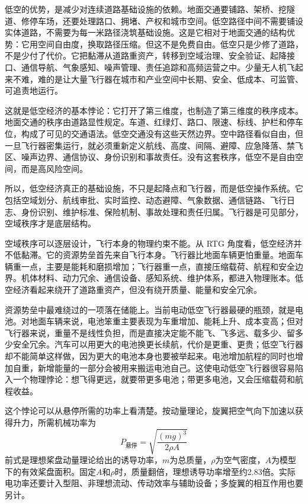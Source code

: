 
低空的优势，是减少对连续道路基础设施的依赖。地面交通要铺路、架桥、挖隧道、修停车场，还要处理路口、拥堵、产权和城市空间。低空路径中间不需要铺设实体道路，不需要为每一米路径浇筑基础设施。这是它相对于地面交通的结构优势：它用空间自由度，换取路径压缩。但这不是免费自由。低空只是少修了道路，不是少付了代价。它把黏滞从道路重资产，转移到空域治理、安全验证、起降接口、通信导航、气象感知、噪声管理、责任追踪和高频运营之中。少量无人机飞起来不难，难的是让大量飞行器在城市和产业空间中长期、安全、低成本、可监管、可追责地运行。

这就是低空经济的基本悖论：它打开了第三维度，也制造了第三维度的秩序成本。地面交通的秩序由道路显性规定。车道、红绿灯、路口、限速、标线、护栏和停车位，构成了可见的交通语法。低空交通没有这些天然边界。空中路径看似自由，但一旦飞行器密集运行，就必须重新定义航线、高度、间隔、避障、应急降落、禁飞区、噪声边界、通信协议、身份识别和事故责任。没有这套秩序，低空不是自由空间，而是高风险空间。

所以，低空经济真正的基础设施，不只是起降点和飞行器，而是低空操作系统。它包括空域划分、航线审批、实时监控、动态避障、气象数据、通信链路、飞行日志、身份识别、维护标准、保险机制、事故处理和责任归属。飞行器是可见部分，空域秩序才是底层结构。

空域秩序可以逐层设计，飞行本身的物理约束不能。从 RTG 角度看，低空经济并不低黏滞。它的资源势垒首先来自飞行本身。飞行器比地面车辆更怕重量。地面车辆重一点，主要是能耗和磨损增加；飞行器重一点，直接压缩载荷、航程和安全边界。机体材料、动力冗余、通信设备、感知系统、维护体系，都进入物理账本。低空经济看起来绕开了道路重资产，但没有绕开质量、能量和安全冗余。


资源势垒中最难绕过的一项落在储能上。当前电动低空飞行器最硬的瓶颈，就是电池。对地面车辆来说，电池笨重主要表现为车重增加、能耗上升、成本变高；但对飞行器来说，重量不是线性负担，而是直接决定能不能飞、飞多远、载多少、留多少安全冗余。汽车可以用更大的电池换更长续航，代价是更重、更贵；低空飞行器却不能简单这样做，因为更大的电池本身也要被举起来。电池增加航程的同时也增加自重，新增能量的一部分会被用来搬运电池自己。这使电动低空飞行器很容易陷入一个物理悖论：想飞得更远，就要带更多电池；带更多电池，又会压缩载荷和航程收益。

这个悖论可以从悬停所需的功率上看清楚。按动量理论，旋翼把空气向下加速以获得升力，所需机械功率为
\begin{equation}
P_{\text{悬停}}=\sqrt{\frac{(mg)^3}{2\rho A}}
\label{eq:ch26-hover}
\end{equation}
前式是理想桨盘动量理论给出的诱导功率，$m$为总质量，$\rho$为空气密度，$A$为模型下的有效桨盘面积。固定$A$和$\rho$时，质量翻倍，理想诱导功率增至约2.83倍。实际电功率还要计入型阻、非理想流动、传动效率与辅助设备；多旋翼的相互作用也要另计。

